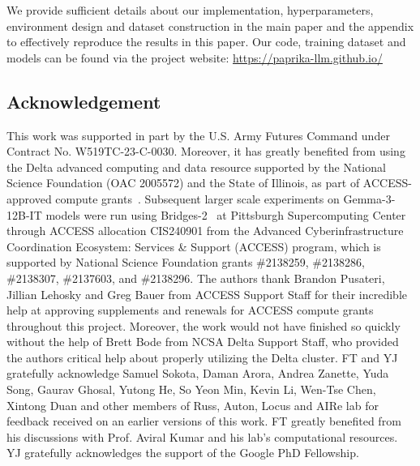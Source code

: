 We provide sufficient details about our implementation, hyperparameters, environment design and dataset construction in the main paper and the appendix to effectively reproduce the results in this paper. Our code, training dataset and models can be found via the project website: \url{https://paprika-llm.github.io/}

\subsection*{Acknowledgement}

This work was supported in part by the U.S. Army Futures Command under Contract No. W519TC-23-C-0030. Moreover, it has greatly benefited from using the Delta advanced computing and data resource supported by the National Science Foundation (OAC 2005572) and the State of Illinois, as part of ACCESS-approved compute grants~\citep{access_compute}. Subsequent larger scale experiments on Gemma-3-12B-IT models were run using Bridges-2~\citep{psc_computing} at Pittsburgh Supercomputing Center through ACCESS  allocation CIS240901 from the Advanced Cyberinfrastructure Coordination Ecosystem: Services \& Support (ACCESS) program, which is supported by National Science Foundation grants \#2138259, \#2138286, \#2138307, \#2137603, and \#2138296. The authors thank Brandon Pusateri, Jillian Lehosky and Greg Bauer from ACCESS Support Staff for their incredible help at approving supplements and renewals for ACCESS compute grants throughout this project. Moreover, the work would not have finished so quickly without the help of Brett Bode from NCSA Delta Support Staff, who provided the authors critical help about properly utilizing the Delta cluster.  FT and YJ gratefully acknowledge Samuel Sokota, Daman Arora, Andrea Zanette, Yuda Song, Gaurav Ghosal, Yutong He, So Yeon Min, Kevin Li, Wen-Tse Chen, Xintong Duan and other members of Russ, Auton, Locus and AIRe lab for feedback received on an earlier versions of this work. FT greatly benefited from his discussions with Prof. Aviral Kumar and his lab's computational resources. YJ gratefully acknowledges the support of the Google PhD Fellowship.
